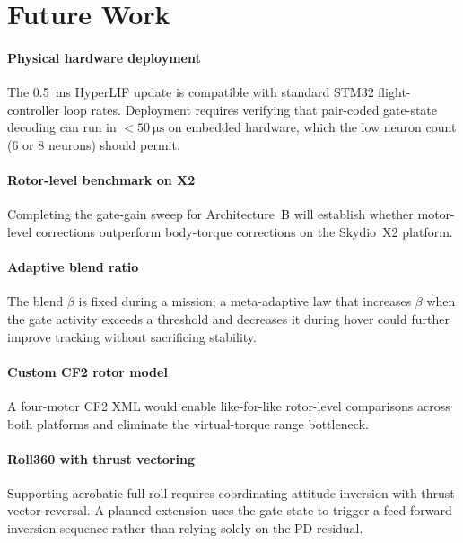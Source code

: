\documentclass[conference]{IEEEtran}
\begin{document}
\section{Future Work}
\label{sec:future}

\paragraph{Physical hardware deployment}
The \SI{0.5}{\milli\second} HyperLIF update is compatible with standard STM32
flight-controller loop rates.
Deployment requires verifying that pair-coded gate-state decoding can run in
$<\SI{50}{\micro\second}$ on embedded hardware, which the low neuron count
(6 or 8 neurons) should permit.

\paragraph{Rotor-level benchmark on X2}
Completing the gate-gain sweep for Architecture~B will establish whether
motor-level corrections outperform body-torque corrections on the Skydio~X2
platform.

\paragraph{Adaptive blend ratio}
The blend $\beta$ is fixed during a mission; a meta-adaptive law that increases
$\beta$ when the gate activity exceeds a threshold and decreases it during
hover could further improve tracking without sacrificing stability.

\paragraph{Custom CF2 rotor model}
A four-motor CF2 XML would enable like-for-like rotor-level comparisons across
both platforms and eliminate the virtual-torque range bottleneck.

\paragraph{Roll360 with thrust vectoring}
Supporting acrobatic full-roll requires coordinating attitude inversion with
thrust vector reversal.
A planned extension uses the gate state to trigger a feed-forward inversion
sequence rather than relying solely on the PD residual.

\end{document}
